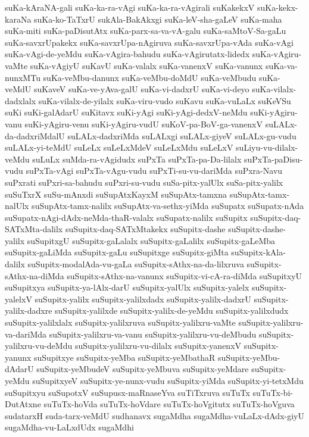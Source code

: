 {suKa-kAraNA-gali
suKa-ka-ra-vAgi
suKa-ka-ra-vAgirali
suKakekxV
suKa-kekx-karaNa
suKa-ko-TaTxrU
sukAla-BakAkxgi
suKa-leV-sha-gaLeV
suKa-maha
suKa-miti
suKa-paDisutAtx
suKa-parx-sa-va-vA-galu
suKa-saMtoV-Sa-gaLu
suKa-savxrUpakekx
suKa-savxrUpa-nAgiruva
suKa-savxrUpa-vAda
suKa-vAgi
suKa-vAgi-de-yeMdu
suKa-vAgira-bahudu
suKa-vAgirutatx-lidedx
suKa-vAgiru-vaMte
suKa-vAgiyU
suKavU
suKa-valalx
suKa-vanenxV
suKa-vanunx
suKa-va-nunxMTu
suKa-veMbu-danunx
suKa-veMbu-doMdU
suKa-veMbudu
suKa-veMdU
suKaveV
suKa-ve-yAva-galU
suKa-vi-dadxrU
suKa-vi-deyo
suKa-vilalx-dadxlalx
suKa-vilalx-de-yilalx
suKa-viru-vudo
suKavu
suKa-vuLaLx
suKeVSu
suKi
suKi-galAdarU
suKitavx
suKi-yAgi
suKi-yAgi-dedxV-neMdu
suKi-yAgiru-vanu
suKi-yAgiru-venu
suKi-yAgiru-vudU
suKoV-pa-BoV-ga-vanenxV
suLALx-da-dadxriMdalU
suLALx-dadxriMda
suLALxgi
suLALx-giyeV
suLALx-gu-vudu
suLALx-yi-teMdU
suLeLx
suLeLxMdeV
suLeLxMdu
suLeLxV
suLiyu-vu-dilalx-veMdu
suLuLx
suMda-ra-vAgidudx
suPxTa
suPxTa-pa-Da-lilalx
suPxTa-paDisu-vudu
suPxTa-vAgi
suPxTa-vAgu-vudu
suPxTi-su-vu-dariMda
suPxra-Navu
suPxrati
suPxri-sa-bahudu
suPxri-su-vudu
suSa-pitx-yalUlx
suSa-pitx-yalilx
suSuTxrX
suSu-mAnxdi
suSupAtxKayxM
suSupAtx-tamxna
suSupAtx-tamx-nalUlx
suSupAtx-tamx-nalilx
suSupAtx-va-sethx-yiMda
suSupatx
suSupatx-nAda
suSupatx-nAgi-dAdx-neMda-thaR-valalx
suSupatx-nalilx
suSupitx
suSupitx-daq-SATxMta-dalilx
suSupitx-daq-SATxMtakekx
suSupitx-dashe
suSupitx-dashe-yalilx
suSupitxgU
suSupitx-gaLalalx
suSupitx-gaLalilx
suSupitx-gaLeMba
suSupitx-gaLiMda
suSupitx-gaLu
suSupitxge
suSupitx-giMta
suSupitx-kAla-dalilx
suSupitx-modalAda-vu-gaLa
suSupitx-sAthx-na-da-lilxruva
suSupitx-sAthx-na-diMda
suSupitx-sAthx-na-vanunx
suSupitx-vi-cA-ra-diMda
suSupitxyU
suSupitxya
suSupitx-ya-lAlx-darU
suSupitx-yalUlx
suSupitx-yalelx
suSupitx-yalelxV
suSupitx-yalilx
suSupitx-yalilxdadx
suSupitx-yalilx-dadxrU
suSupitx-yalilx-dadxre
suSupitx-yalilxde
suSupitx-yalilx-de-yeMdu
suSupitx-yalilxdudx
suSupitx-yalilxlalx
suSupitx-yalilxruva
suSupitx-yalilxru-vaMte
suSupitx-yalilxru-va-dariMda
suSupitx-yalilxru-va-vanu
suSupitx-yalilxru-vu-deMbudu
suSupitx-yalilxru-vu-deMdu
suSupitx-yalilxru-vu-dilalx
suSupitx-yanenxV
suSupitx-yanunx
suSupitxye
suSupitx-yeMba
suSupitx-yeMbathaR
suSupitx-yeMbu-dAdarU
suSupitx-yeMbudeV
suSupitx-yeMbuva
suSupitx-yeMdare
suSupitx-yeMdu
suSupitxyeV
suSupitx-ye-nunx-vudu
suSupitx-yiMda
suSupitx-yi-tetxMdu
suSupitxyu
suSupotxV
suSupusx-maRnaseYva
suTiTxruva
suTuTx
suTuTx-bi-DutAtxne
suTuTx-hoVda
suTuTx-hoVdare
suTuTx-hoVgitutx
suTuTx-hoVguva
sudatarxH
suda-tarx-veMdU
sudhanavx
sugaMdha
sugaMdha-vuLaLx-dAdx-giyU
sugaMdha-vu-LaLxdUdx
sugaMdhi
}

